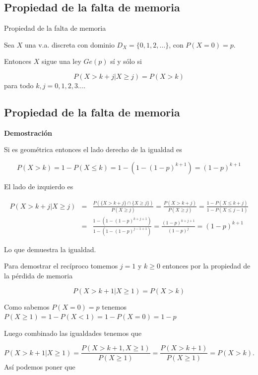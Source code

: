 \documentclass[]{book}
\begin{document}
\hypertarget{propiedad-de-la-falta-de-memoria}{%
\subsection{Propiedad de la falta de memoria}\label{propiedad-de-la-falta-de-memoria}}

 Propiedad de la falta de memoria

Sea \(X\) una v.a. discreta con dominio \(D_X=\{0,1,2,\ldots\}\), con \(P(X=0)=p\).

Entonces \(X\) sigue una ley \(Ge(p)\) sí y sólo si

\[
P\left(X> k+j\big| X\geq j\right)=P(X> k)
\]
para todo \(k,j=0,1,2,3\ldots\).

\hypertarget{propiedad-de-la-falta-de-memoria-1}{%
\subsection{Propiedad de la falta de memoria}\label{propiedad-de-la-falta-de-memoria-1}}

\textbf{Demostración}

Si es geométrica entonces el lado derecho de la igualdad es

\[
P(X>k)=1-P(X\leq k)=1-\left(1-(1-p)^{k+1}\right)=(1-p)^{k+1}
\]

El lado de izquierdo es

\[
\begin{eqnarray*} 
P\left(X> k+j\big| X\geq j\right)&=&\frac{P\left(\{X> k+j\}\cap \{X\geq j\} \right)}{P\left(X\geq j\right)}=
\frac{P\left(X>k+j \right)}{P\left(X\geq j \right)} = \frac{1-P(X\leq k+j)}{1-P(X\leq j-1)}\\
&=&  \frac{1-(1-(1-p)^{k+j+1})}{1-(1-(1-p)^{j-1+1})} =\frac{(1-p)^{k+j+1}}{(1-p)^{j}} = (1-p)^{k+1}
\end{eqnarray*}
\]

Lo que demuestra la igualdad.

Para demostrar el recíproco tomemos \(j=1\) y \(k\geq 0\) entonces por la propiedad de la pérdida de memoria

\[
P\left(X> k+1\big| X\geq 1\right)=P(X> k)
\]

Como sabemos \(P(X=0)=p\) tenemos \(P(X \geq 1 )=1-P(X<1)=1-P(X=0)=1-p\)

Luego combinado las igualdades tenemos que

\[
P\left(X> k+1\big| X\geq 1\right)=\frac{P(X>k+1, X\geq 1)}{P(X\geq 1)}=\frac{P(X>k+1)}{P(X\geq 1)}=P(X>k).
\]
Así podemos poner que
\end{document}
